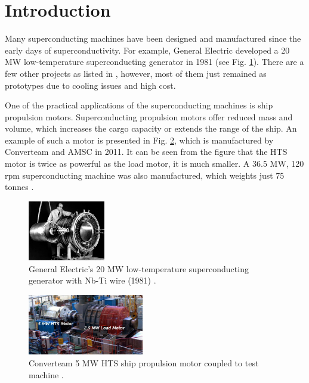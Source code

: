 \documentclass[12pt]{IET02}
\begin{document}
\section{Introduction}

Many superconducting machines have been designed and manufactured since the early days of superconductivity. For example, General Electric developed a 20 MW low-temperature superconducting generator in 1981 (see Fig. \ref{GE_LTS_machine}). There are a few other projects as listed in \cite{Barnes2005}, however, most of them just remained as prototypes due to cooling issues and high cost.

One of the practical applications of the superconducting machines is ship propulsion motors. Superconducting propulsion motors offer reduced mass and volume, which increases the cargo capacity or extends the range of the ship. An example of such a motor is presented in Fig. \ref{converteam_5MW}, which is manufactured by Converteam and AMSC in 2011. It can be seen from the figure that the HTS motor is twice as powerful as the load motor, it is much smaller. A 36.5 MW, 120 rpm superconducting machine was also manufactured, which weights just 75 tonnes \citep{Gamble2011}.

  \begin{figure}[]
    \centering
    \includegraphics[width=0.3\textwidth]{GE_LTS_machine}
    \caption{General Electric's 20 MW low-temperature superconducting generator with Nb-Ti wire (1981) \cite{Barnes2005}.} 
    \label{GE_LTS_machine}
  \end{figure}

  \begin{figure}[]
    \centering
    \includegraphics[width=0.45\textwidth]{converteam_5MW}
    \caption{Converteam 5 MW HTS ship propulsion motor coupled to test machine  \cite{Kalsi2004h}.} 
    \label{converteam_5MW}
  \end{figure}
\end{document}
